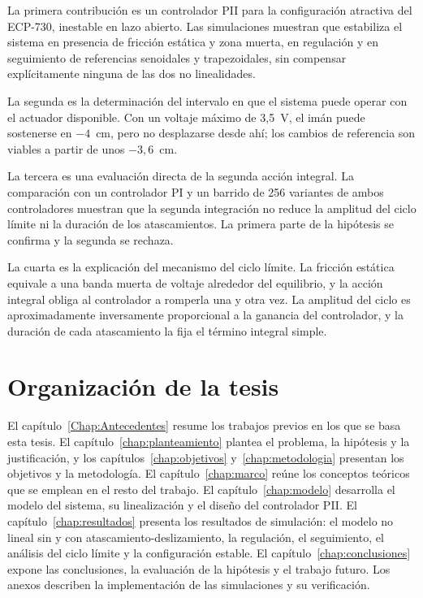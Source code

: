 La primera contribución es un controlador PII para la configuración atractiva del ECP-730, inestable en lazo abierto. Las simulaciones muestran que estabiliza el sistema en presencia de fricción estática y zona muerta, en regulación y en seguimiento de referencias senoidales y trapezoidales, sin compensar explícitamente ninguna de las dos no linealidades.

La segunda es la determinación del intervalo en que el sistema puede operar con el actuador disponible. Con un voltaje máximo de 3{,}5~V, el imán puede sostenerse en $-4$~cm, pero no desplazarse desde ahí; los cambios de referencia son viables a partir de unos $-3{,}6$~cm.

La tercera es una evaluación directa de la segunda acción integral. La comparación con un controlador PI y un barrido de 256 variantes de ambos controladores muestran que la segunda integración no reduce la amplitud del ciclo límite ni la duración de los atascamientos. La primera parte de la hipótesis se confirma y la segunda se rechaza.

La cuarta es la explicación del mecanismo del ciclo límite. La fricción estática equivale a una banda muerta de voltaje alrededor del equilibrio, y la acción integral obliga al controlador a romperla una y otra vez. La amplitud del ciclo es aproximadamente inversamente proporcional a la ganancia del controlador, y la duración de cada atascamiento la fija el término integral simple.

\section{Organización de la tesis}

El capítulo~\ref{Chap:Antecedentes} resume los trabajos previos en los que se basa esta tesis. El capítulo~\ref{chap:planteamiento} plantea el problema, la hipótesis y la justificación, y los capítulos~\ref{chap:objetivos} y~\ref{chap:metodologia} presentan los objetivos y la metodología. El capítulo~\ref{chap:marco} reúne los conceptos teóricos que se emplean en el resto del trabajo. El capítulo~\ref{chap:modelo} desarrolla el modelo del sistema, su linealización y el diseño del controlador PII. El capítulo~\ref{chap:resultados} presenta los resultados de simulación: el modelo no lineal sin y con atascamiento-deslizamiento, la regulación, el seguimiento, el análisis del ciclo límite y la configuración estable. El capítulo~\ref{chap:conclusiones} expone las conclusiones, la evaluación de la hipótesis y el trabajo futuro. Los anexos describen la implementación de las simulaciones y su verificación.
